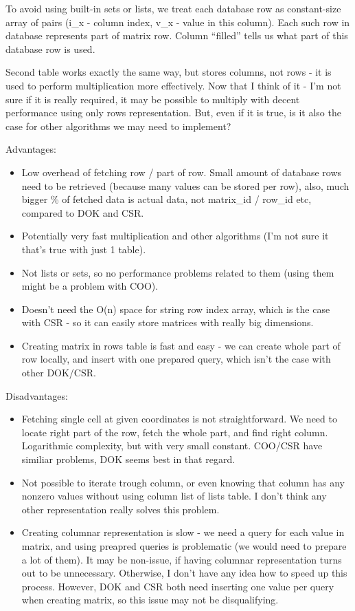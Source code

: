 \documentclass{article}
\begin{document}
To avoid using built-in sets or lists, we treat each database row as constant-size array of pairs (i\_x - column index, v\_x - value in this column). Each such row in database represents part of matrix row. Column ``filled'' tells us what part of this database row is used. 

Second table works exactly the same way, but stores columns, not rows - it is used to perform multiplication more effectively. Now that I think of it - I'm not sure if it is really required, it may be possible to multiply with decent performance using only rows representation. But, even if it is true, is it also the case for other algorithms we may need to implement?

Advantages:
\begin{itemize}
 \item Low overhead of fetching row / part of row. Small amount of database rows need to be retrieved (because many values can be stored per row), also, much bigger \% of fetched data is actual data, not matrix\_id / row\_id etc, compared to DOK and CSR.
 \item Potentially very fast multiplication and other algorithms (I'm not sure it that's true with just 1 table).
 \item Not lists or sets, so no performance problems related to them (using them might be a problem with COO).
 \item Doesn't need the O(n) space for string row index array, which is the case with CSR - so it can easily store matrices with really big dimensions.
 \item Creating matrix in rows table is fast and easy - we can create whole part of row locally, and insert with one prepared query, which isn't the case with other DOK/CSR.
\end{itemize}

Disadvantages:
\begin{itemize}
 \item Fetching single cell at given coordinates is not straightforward. We need to locate right part of the row, fetch the whole part, and find right column. Logarithmic complexity, but with very small constant. COO/CSR have similiar problems, DOK seems best in that regard.
 \item Not possible to iterate trough column, or even knowing that column has any nonzero values without using column list of lists table. I don't think any other representation really solves this problem.
 \item Creating columnar representation is slow - we need a query for each value in matrix, and using preapred queries is problematic (we would need to prepare a lot of them). It may be non-issue, if having columnar representation turns out to be unnecessary. Otherwise, I don't have any idea how to speed up this process. However, DOK and CSR both need inserting one value per query when creating matrix, so this issue may not be disqualifying.
\end{itemize}
\end{document}
